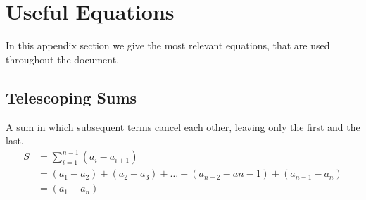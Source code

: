
\thispagestyle{fancyplain}

\chapter{Useful Equations}
In this appendix section we give the most relevant equations, that are used
throughout the document.

\section{Telescoping Sums}
\label{appendix:equations|eqn:telescoping}
A sum in which subsequent terms cancel each other, leaving only the first and
the last.
\begin{align}
	S &= \sum_{i=1}^{n-1}(a_{i} - a_{i+1}) \\
	&= (a_1-a_2)+(a_2-a_3) + \dots + (a_{n-2}-a{n-1}) + (a_{n-1}-a_n)
	\nonumber \\
	&= (a_1 - a_n) \nonumber
\end{align}


